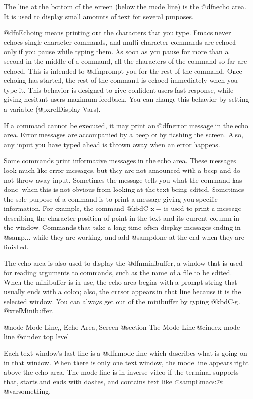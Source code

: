   The line at the bottom of the screen (below the mode line) is the
@dfn{echo area}.  It is used to display small amounts of text for several
purposes.

  @dfn{Echoing} means printing out the characters that you type.  Emacs
never echoes single-character commands, and multi-character commands are
echoed only if you pause while typing them.  As soon as you pause for more
than a second in the middle of a command, all the characters of the command
so far are echoed.  This is intended to @dfn{prompt} you for the rest of
the command.  Once echoing has started, the rest of the command is echoed
immediately when you type it.  This behavior is designed to give confident
users fast response, while giving hesitant users maximum feedback.  You
can change this behavior by setting a variable (@pxref{Display Vars}).

  If a command cannot be executed, it may print an @dfn{error message} in
the echo area.  Error messages are accompanied by a beep or by flashing the
screen.  Also, any input you have typed ahead is thrown away when an error
happens.

  Some commands print informative messages in the echo area.  These
messages look much like error messages, but they are not announced with a
beep and do not throw away input.  Sometimes the message tells you what the
command has done, when this is not obvious from looking at the text being
edited.  Sometimes the sole purpose of a command is to print a message
giving you specific information.  For example, the command @kbd{C-x =} is
used to print a message describing the character position of point in the
text and its current column in the window.  Commands that take a long time
often display messages ending in @samp{...} while they are working, and
add @samp{done} at the end when they are finished.

  The echo area is also used to display the @dfn{minibuffer}, a window that
is used for reading arguments to commands, such as the name of a file to be
edited.  When the minibuffer is in use, the echo area begins with a prompt
string that usually ends with a colon; also, the cursor appears in that line
because it is the selected window.  You can always get out of the
minibuffer by typing @kbd{C-g}.  @xref{Minibuffer}.

@node Mode Line,, Echo Area, Screen
@section The Mode Line
@cindex mode line
@cindex top level

  Each text window's last line is a @dfn{mode line} which describes what is
going on in that window.  When there is only one text window, the mode line
appears right above the echo area.  The mode line is in inverse video if
the terminal supports that, starts and ends with dashes, and contains text
like @samp{Emacs:@: @var{something}}.

